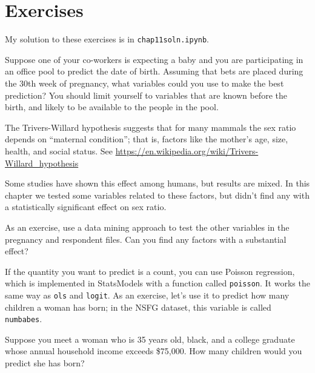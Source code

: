 \section{Exercises}

My solution to these exercises is in \verb"chap11soln.ipynb".

\begin{exercise}
Suppose one of your co-workers is expecting a baby and you are
participating in an office pool to predict the date of birth.
Assuming that bets are placed during the 30th week of pregnancy, what
variables could you use to make the best prediction?  You should limit
yourself to variables that are known before the birth, and likely to
be available to the people in the pool.

\end{exercise}


\begin{exercise}
The Trivers-Willard hypothesis suggests that for many mammals the
sex ratio depends on ``maternal condition''; that is,
factors like the mother's age, size, health, and social status.
See \url{https://en.wikipedia.org/wiki/Trivers-Willard_hypothesis}

Some studies have shown this effect among humans, but results are
mixed.  In this chapter we tested some variables related to these
factors, but didn't find any with a statistically significant effect
on sex ratio.
   

As an exercise, use a data mining approach to test the other variables
in the pregnancy and respondent files.  Can you find any factors with
a substantial effect?  

\end{exercise}


\begin{exercise}
If the quantity you want to predict is a count, you can use Poisson
regression, which is implemented in StatsModels with a function called
{\tt poisson}.  It works the same way as {\tt ols} and {\tt logit}.
As an exercise, let's use it to predict how many children a woman
has born; in the NSFG dataset, this variable is called {\tt numbabes}.

Suppose you meet a woman who is 35 years old, black, and a college
graduate whose annual household income exceeds \$75,000.  How many
children would you predict she has born?
\end{exercise}


